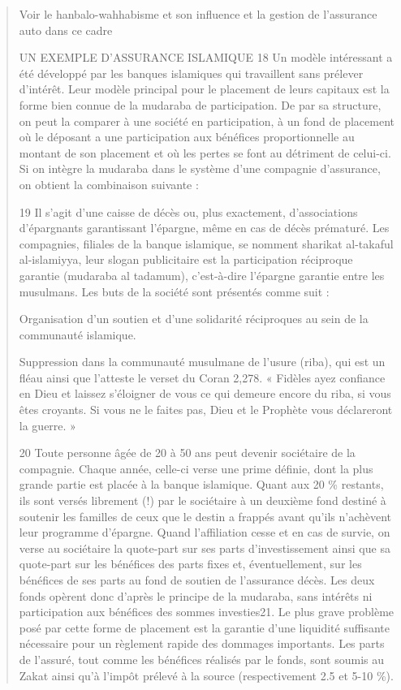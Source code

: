 \begin{quote}
\begin{Synthesis}
Voir le hanbalo-wahhabisme et son influence et la gestion de l'assurance auto dans ce cadre
\end{Synthesis}

UN EXEMPLE D’ASSURANCE ISLAMIQUE
18 Un modèle intéressant a été développé par les banques islamiques qui travaillent sans prélever d’intérêt. Leur modèle principal pour le placement de leurs capitaux est la forme bien connue de la mudaraba de participation. De par sa structure, on peut la comparer à une société en participation, à un fond de placement où le déposant a une participation aux bénéfices proportionnelle au montant de son placement et où les pertes se font au détriment de celui-ci. Si on intègre la mudaraba dans le système d’une compagnie d’assurance, on obtient la combinaison suivante :

19 Il s’agit d’une caisse de décès ou, plus exactement, d’associations d’épargnants garantissant l’épargne, même en cas de décès prématuré. Les compagnies, filiales de la banque islamique, se nomment sharikat al-takaful al-islamiyya, leur slogan publicitaire est la participation réciproque garantie (mudaraba al tadamum), c’est-à-dire l’épargne garantie entre les musulmans. Les buts de la société sont présentés comme suit :

Organisation d’un soutien et d’une solidarité réciproques au sein de la communauté islamique.

Suppression dans la communauté musulmane de l’usure (riba), qui est un fléau ainsi que l’atteste le verset du Coran 2,278. « Fidèles ayez confiance en Dieu et laissez s’éloigner de vous ce qui demeure encore du riba, si vous êtes croyants. Si vous ne le faites pas, Dieu et le Prophète vous déclareront la guerre. »

20 Toute personne âgée de 20 à 50 ans peut devenir sociétaire de la compagnie. Chaque année, celle-ci verse une prime définie, dont la plus grande partie est placée à la banque islamique. Quant aux 20 \% restants, ils sont versés librement (!) par le sociétaire à un deuxième fond destiné à soutenir les familles de ceux que le destin a frappés avant qu’ils n’achèvent leur programme d’épargne. Quand l’affiliation cesse et en cas de survie, on verse au sociétaire la quote-part sur ses parts d’investissement ainsi que sa quote-part sur les bénéfices des parts fixes et, éventuellement, sur les bénéfices de ses parts au fond de soutien de l’assurance décès. Les deux fonds opèrent donc d’après le principe de la mudaraba, sans intérêts ni participation aux bénéfices des sommes investies21. Le plus grave problème posé par cette forme de placement est la garantie d’une liquidité suffisante nécessaire pour un règlement rapide des dommages importants. Les parts de l’assuré, tout comme les bénéfices réalisés par le fonds, sont soumis au Zakat ainsi qu’à l’impôt prélevé à la source (respectivement 2.5 et 5-10 \%).


\end{quote}

